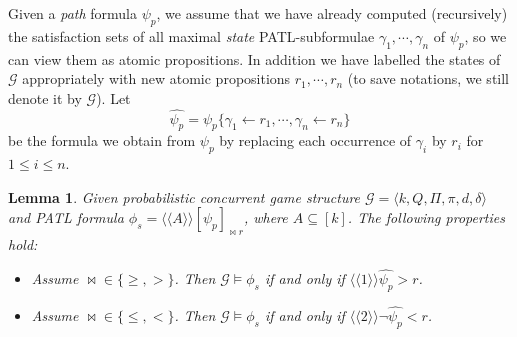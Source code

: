 \documentclass[times, 10 pt,twocolumn]{article}
\newtheorem{lemma}[theorem]{Lemma}{\bfseries}{\itshape}
\newcommand{\mc}[1]{\mathcal{#1}}
\newcommand{\lla}{\langle\langle}
\newcommand{\rra}{\rangle\rangle}
\begin{document}
Given a \emph{path} formula $\psi_p$, we assume that we have
already computed (recursively) the satisfaction sets of all
maximal \emph{state} PATL-subformulae $\gamma_1, \cdots, \gamma_n$
of $\psi_p$, so we can view them as atomic propositions. In
addition we have labelled the states of $\mc{G}$ appropriately
with new atomic propositions $r_1, \cdots, r_n$ (to save
notations, we still denote it by $\mc{G}$).
%
Let
\[ \widehat{\psi_p} = \psi_p\{ \gamma_1 \leftarrow r_1, \cdots,  \gamma_n \leftarrow r_n \}\]
be the formula we obtain from $\psi_p$ by replacing each
occurrence of $\gamma_i$ by $r_i$ for $1\leq i\leq n$. %

\begin{lemma} \label{cru} Given probabilistic concurrent
game structure $\mc{G}=\langle k, Q, \Pi, \pi, d, \delta\rangle$
and PATL formula $\phi_s=\lla A\rra[\psi_p]_{\bowtie r}$, where
$A\subseteq [k]$. The following properties hold:
\begin{itemize}
  \item[(i)] Assume $\bowtie\in \{\geq, > \}$. Then $\mc{G}\models
  \phi_s$ if and only if $\lla 1\rra \widehat{\psi_p} > r$.

  \item[(ii)] Assume $\bowtie\in \{\leq, < \}$. Then $\mc{G}\models
  \phi_s$ if and only if $\lla 2\rra \neg\widehat{\psi_p} < r$.
\end{itemize}
\end{lemma}
\end{document}
